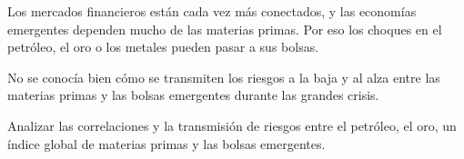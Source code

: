 \documentclass{article}
\newcommand{\bodysize}{\fontsize{27}{35.6}\selectfont}
\newcommand{\cardtitlesize}{\fontsize{31.9}{38.3}\selectfont}
\newcommand{\smallsize}{\fontsize{22.1}{28.7}\selectfont}
\newcommand{\cardtitle}[2][navy]{{\color{#1}\cardtitlesize\bfseries\textls[110]{\MakeUppercase{#2}}}\par\vspace{7mm}}
\begin{document}
\vfill
\hspace*{34mm}\begin{minipage}{773mm}
\begin{tcolorbox}[enhanced, sharp corners, colback=navy, boxrule=0pt, left=16mm, right=16mm, top=12mm, bottom=11mm,
  fontupper=\bodysize\raggedright, overlay={\fill[gold] (frame.north west) rectangle ([yshift=-5mm]frame.north east);}]
\begin{minipage}[t]{237.7mm}\raggedright{\color{acento}\smallsize\bfseries{}}\par{}\end{minipage}\hfill\begin{minipage}[t]{237.7mm}\raggedright{\color{acento}\smallsize\bfseries{}}\par{}\end{minipage}\hfill\begin{minipage}[t]{237.7mm}\raggedright{\color{acento}\smallsize\bfseries{}}\par{}\end{minipage}
\end{tcolorbox}
\end{minipage}

\vfill
\hspace*{34mm}\begin{minipage}{773mm}
\begin{tcbraster}[raster columns=3, raster equal height, raster column skip=16mm]
\begin{tcolorbox}[card]\cardtitle{Contexto}Los mercados financieros están cada vez más conectados, y las economías emergentes dependen mucho de las materias primas. Por eso los choques en el petróleo, el oro o los metales pueden pasar a sus bolsas.\end{tcolorbox}
\begin{tcolorbox}[card]\cardtitle{Problema}No se conocía bien cómo se transmiten los riesgos a la baja y al alza entre las materias primas y las bolsas emergentes durante las grandes crisis.\end{tcolorbox}
\begin{tcolorbox}[card]\cardtitle{Objetivo}Analizar las correlaciones y la transmisión de riesgos entre el petróleo, el oro, un índice global de materias primas y las bolsas emergentes.\end{tcolorbox}
\end{tcbraster}
\end{minipage}
\end{document}
